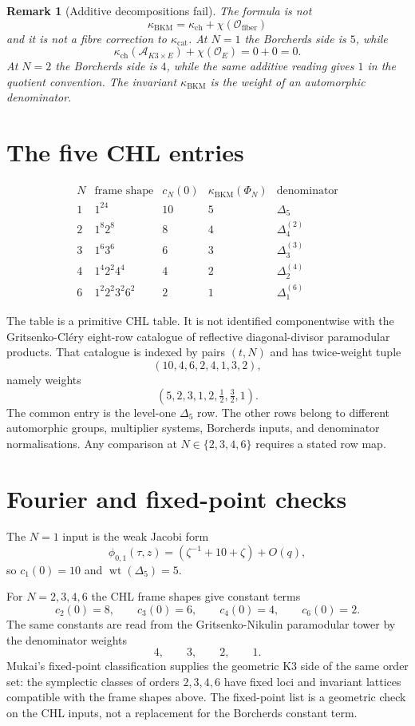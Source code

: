 \documentclass[11pt]{article}
\newtheorem{remark}[theorem]{Remark}
\providecommand{\kBKM}{\kappa_{\mathrm{BKM}}}
\providecommand{\kch}{\kappa_{\mathrm{ch}}}
\providecommand{\kcat}{\kappa_{\mathrm{cat}}}
\providecommand{\cA}{\mathcal{A}}
\begin{document}
\begin{remark}[Additive decompositions fail]
\label{rem:additive-decomposition-fails}
The formula is not
\[
  \kBKM=\kch+\chi(\mathcal O_{\mathrm{fiber}})
\]
and it is not a fibre correction to $\kcat$. At $N=1$ the Borcherds
side is $5$, while
\[
  \kch(\cA_{K3\times E})+\chi(\mathcal O_E)=0+0=0.
\]
At $N=2$ the Borcherds side is $4$, while the same additive reading
gives $1$ in the quotient convention. The invariant $\kBKM$ is the
weight of an automorphic denominator.
\end{remark}

\section{The five CHL entries}
\label{sec:five-chl-entries}

\[
\begin{array}{c|c|c|c|c}
N & \text{frame shape} & c_N(0) & \kBKM(\Phi_N) &
\text{denominator} \\
\hline
1 & 1^{24} & 10 & 5 & \Delta_5 \\
2 & 1^8 2^8 & 8 & 4 & \Delta_4^{(2)} \\
3 & 1^6 3^6 & 6 & 3 & \Delta_3^{(3)} \\
4 & 1^4 2^2 4^4 & 4 & 2 & \Delta_2^{(4)} \\
6 & 1^2 2^2 3^2 6^2 & 2 & 1 & \Delta_1^{(6)}
\end{array}
\]

The table is a primitive CHL table. It is not identified componentwise
with the Gritsenko-Cl\'ery eight-row catalogue of reflective
diagonal-divisor paramodular products. That catalogue is indexed by
pairs $(t,N)$ and
has twice-weight tuple
\[
  (10,4,6,2,4,1,3,2),
\]
namely weights
\[
  (5,2,3,1,2,\tfrac12,\tfrac32,1).
\]
The common entry is the level-one $\Delta_5$ row. The other rows belong
to different automorphic groups, multiplier systems, Borcherds inputs,
and denominator normalisations. Any comparison at
$N\in\{2,3,4,6\}$ requires a stated row map.

\section{Fourier and fixed-point checks}
\label{sec:fourier-fixed-point-checks}

The $N=1$ input is the weak Jacobi form
\[
  \phi_{0,1}(\tau,z)
  =(\zeta^{-1}+10+\zeta)+O(q),
\]
so $c_1(0)=10$ and $\operatorname{wt}(\Delta_5)=5$.

For $N=2,3,4,6$ the CHL frame shapes give constant terms
\[
  c_2(0)=8,\qquad c_3(0)=6,\qquad
  c_4(0)=4,\qquad c_6(0)=2.
\]
The same constants are read from the Gritsenko-Nikulin paramodular
tower by the denominator weights
\[
  4,\qquad 3,\qquad 2,\qquad 1.
\]
Mukai's fixed-point classification supplies the geometric K3 side of
the same order set: the symplectic classes of orders $2,3,4,6$ have
fixed loci and invariant lattices compatible with the frame shapes
above. The fixed-point list is a geometric check on the CHL inputs,
not a replacement for the Borcherds constant term.
\end{document}
